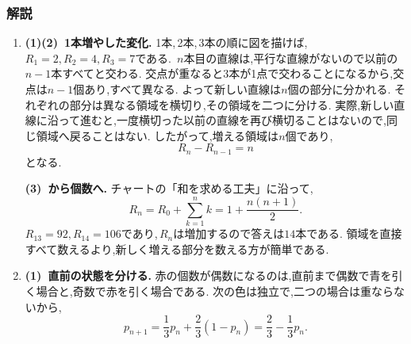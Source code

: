       \subsubsection{解説}\label{節：発展入門：解法}
        \begin{enumerate}[label=\textbf{問\arabic*.},leftmargin=3.8em,format=\bookitemlink{practice-bridge}{solution}{problem}]
          \item \textbf{(1)(2)~1本増やした変化.}
                1本,\,2本,\,3本の順に図を描けば,\,$\displaystyle R_1=2,R_2=4,R_3=7$である.\,
                $\displaystyle n$本目の直線は,平行な直線がないので以前の$\displaystyle n-1$本すべてと交わる.
                交点が重なると3本が1点で交わることになるから,交点は$\displaystyle n-1$個あり,すべて異なる.
                よって新しい直線は$\displaystyle n$個の部分に分かれる.
                それぞれの部分は異なる領域を横切り,その領域を二つに分ける.
                実際,新しい直線に沿って進むと,一度横切った以前の直線を再び横切ることはないので,同じ領域へ戻ることはない.
                したがって,増える領域は$\displaystyle n$個であり,
                \[
                  R_n-R_{n-1}=n
                \]
                となる.

                \smallskip
                \textbf{(3)~から個数へ.}
                チャートの「和を求める工夫」に沿って,
                \[
                  R_n=R_0+\sum_{k=1}^{n}k
                     =1+\frac{n(n+1)}2.
                \]
                $\displaystyle R_{13}=92,R_{14}=106$であり,\,$\displaystyle R_n$は増加するので答えは$\displaystyle 14$本である.
                領域を直接すべて数えるより,新しく増える部分を数える方が簡単である.
          \item \textbf{(1)~直前の状態を分ける.}
                赤の個数が偶数になるのは,直前まで偶数で青を引く場合と,奇数で赤を引く場合である.
                次の色は独立で,二つの場合は重ならないから,
                \[
                  p_{n+1}=\frac13p_n+\frac23(1-p_n)
                         =\frac23-\frac13p_n.
                \]


\end{enumerate}

